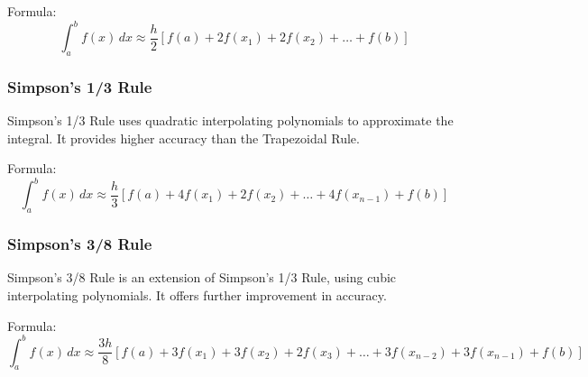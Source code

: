 \documentclass{article}
\begin{document}
Formula:
\[ \int_{a}^{b} f(x) \,dx \approx \frac{h}{2} [f(a) + 2f(x_1) + 2f(x_2) + \ldots + f(b)] \]

\subsubsection*{Simpson's 1/3 Rule}
Simpson's 1/3 Rule uses quadratic interpolating polynomials to approximate the integral. It provides higher accuracy than the Trapezoidal Rule.

Formula:
\[ \int_{a}^{b} f(x) \,dx \approx \frac{h}{3} [f(a) + 4f(x_1) + 2f(x_2) + \ldots + 4f(x_{n-1}) + f(b)] \]

\subsubsection*{Simpson's 3/8 Rule}
Simpson's 3/8 Rule is an extension of Simpson's 1/3 Rule, using cubic interpolating polynomials. It offers further improvement in accuracy.

Formula:
\[ \int_{a}^{b} f(x) \,dx \approx \frac{3h}{8} [f(a) + 3f(x_1) + 3f(x_2) + 2f(x_3) + \ldots + 3f(x_{n-2}) + 3f(x_{n-1}) + f(b)] \]
\end{document}
